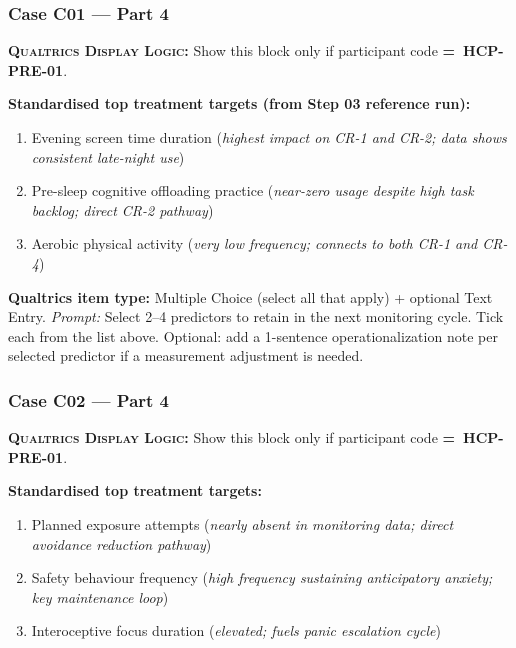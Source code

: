 \documentclass[11pt,a4paper]{article}
\newcommand{\checkboxresponse}[1]{\begin{tcolorbox}[colback=ResponseBG,colframe=GoldAmber,boxrule=0.6pt,arc=1.5mm,left=6pt,right=6pt,top=5pt,bottom=5pt]\small\textbf{\color{GoldAmber}Qualtrics item type:} Multiple Choice (select all that apply) + optional Text Entry. \quad \textit{Prompt:} #1\end{tcolorbox}}
\newcommand{\dlnote}[1]{\par\vspace{0.15em}\noindent\begin{tcolorbox}[colback=AccentAmber,colframe=GoldAmber,boxrule=0.45pt,arc=1mm,left=5pt,right=5pt,top=2.5pt,bottom=2.5pt]\footnotesize\textbf{\color{GoldAmber}\scshape Qualtrics Display Logic:} Show this block only if participant code \textbf{=~#1}.\end{tcolorbox}\vspace{0.1em}}
\begin{document}
\vspace{0.5em}

\subsubsection*{Case C01 --- Part 4}
\dlnote{HCP-PRE-01}

\begin{contextbox}
\small\textbf{Standardised top treatment targets (from Step 03 reference run):}
\begin{enumerate}[topsep=2pt,itemsep=1pt,label=\arabic*.]
\item Evening screen time duration (\textit{highest impact on CR-1 and CR-2; data shows consistent late-night use})
\item Pre-sleep cognitive offloading practice (\textit{near-zero usage despite high task backlog; direct CR-2 pathway})
\item Aerobic physical activity (\textit{very low frequency; connects to both CR-1 and CR-4})
\end{enumerate}
\end{contextbox}

\checkboxresponse{Select 2--4 predictors to retain in the next monitoring cycle. Tick each from the list above. Optional: add a 1-sentence operationalization note per selected predictor if a measurement adjustment is needed.}

\vspace{0.4em}

\subsubsection*{Case C02 --- Part 4}
\dlnote{HCP-PRE-01}

\begin{contextbox}
\small\textbf{Standardised top treatment targets:}
\begin{enumerate}[topsep=2pt,itemsep=1pt,label=\arabic*.]
\item Planned exposure attempts (\textit{nearly absent in monitoring data; direct avoidance reduction pathway})
\item Safety behaviour frequency (\textit{high frequency sustaining anticipatory anxiety; key maintenance loop})
\item Interoceptive focus duration (\textit{elevated; fuels panic escalation cycle})
\end{enumerate}
\end{contextbox}
\end{document}
